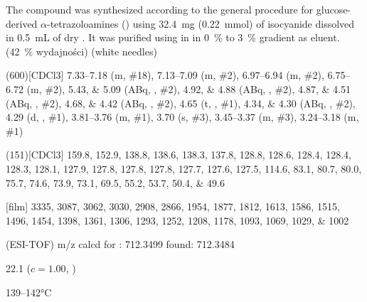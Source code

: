 The compound was synthesized according to the general procedure for glucose-derived $\alpha$-tetrazoloamines () using \SI{32.4}{\milli\gram} (\SI{0.22}{\milli\mol}) of  isocyanide dissolved in \SI{0.5}{\milli\liter} of dry .
It was purified using  in  in \SI{0}{\percent} to \SI{3}{\percent} gradient as eluent.
(\SI{42}{\percent} wydajności) (white needles)
\begin{fullexp}
	\NMR(600)[CDCl3] \numrange{7.33}{7.18} (m, \#{18}), \numrange{7.13}{7.09} (m, \#{2}), \numrange{6.97}{6.94} (m, \#{2}), \numrange{6.75}{6.72} (m, \#{2}), \numlist{5.43;5.09} (ABq, , \#{2}), \numlist{4.92;4.88} (ABq, , \#{2}), \numlist{4.87;4.51} (ABq, , \#{2}), \numlist{4.68;4.42} (ABq, , \#{2}), \num{4.65} (t, , \#{1}), \numlist{4.34;4.30} (ABq, , \#{2}), \num{4.29} (d, , \#{1}), \numrange{3.81}{3.76} (m, \#{1}), \num{3.70} (s, \#{3}), \numrange{3.45}{3.37} (m, \#{3}), \numrange{3.24}{3.18} (m, \#{1})\par\noindent
	(151)[CDCl3] \numlist{159.8; 152.9; 138.8; 138.6; 138.3; 137.8; 128.8; 128.6; 128.4; 128.4; 128.3; 128.1; 127.9; 127.8; 127.8; 127.8; 127.7; 127.6; 127.5; 114.6; 83.1; 80.7; 80.0; 75.7; 74.6; 73.9; 73.1; 69.5; 55.2; 53.7; 50.4; 49.6}\par\noindent
	[film] \numlist{3335; 3087; 3062; 3030; 2908; 2866; 1954; 1877; 1812; 1613; 1586; 1515; 1496; 1454; 1398; 1361; 1306; 1293; 1252; 1208; 1178; 1093; 1069; 1029; 1002}\par\noindent
	 (ESI-TOF) m/z calcd for : \num{712.3499} found: \num{712.3484}\par\noindent
	\data{[$\alpha^{23}_D$]~$=$} \num{22.1} ($c = 1.00$, )\par\noindent
	 \numrange{139}{142}\si{\celsius}
\end{fullexp}

